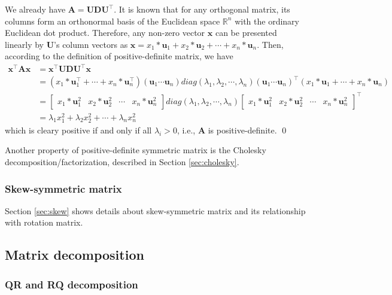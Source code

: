 \documentclass[12pt]{article}
\numberwithin{equation}{section}
\renewenvironment{proof}{{\bfseries Proof.}}{\qed \\}
\begin{document}
\begin{proof}
We already have $\mathbf{A} = \mathbf{U}\mathbf{D}\mathbf{U}^\top$. It is known that for any orthogonal matrix, its columns form an orthonormal basis of the Euclidean space $\mathbb{R}^n$ with the ordinary Euclidean dot product. Therefore, any non-zero vector $\mathbf{x}$ can be presented linearly by $\mathbf{U}$'s column vectors as $\mathbf{x} = x_1*\mathbf{u}_1 + x_2*\mathbf{u}_2 + \cdots + x_n*\mathbf{u}_n$. Then, according to the definition of positive-definite matrix, we have
\begin{align*}
\mathbf{x}^\top \mathbf{A}\mathbf{x} & = \mathbf{x}^\top \mathbf{U}\mathbf{D}\mathbf{U}^\top \mathbf{x} \\
& = (x_1*\mathbf{u}_1^\top + \cdots + x_n*\mathbf{u}_n^\top)
(\mathbf{u}_1 \cdots \mathbf{u}_n)
diag(\lambda_1, \lambda_2, \cdots,\lambda_n)
(\mathbf{u}_1 \cdots \mathbf{u}_n)^\top
(x_1*\mathbf{u}_1 + \cdots + x_n*\mathbf{u}_n) \\
& =
\begin{bmatrix}
x_1*\mathbf{u}_1^2 & x_2*\mathbf{u}_2^2 & \cdots & x_n*\mathbf{u}_n^2
\end{bmatrix}
diag(\lambda_1, \lambda_2, \cdots,\lambda_n)
\begin{bmatrix}
x_1*\mathbf{u}_1^2 & x_2*\mathbf{u}_2^2 & \cdots & x_n*\mathbf{u}_n^2
\end{bmatrix} ^\top \\
&= \lambda_1 x_1^2 + \lambda_2 x_2^2 + \cdots + \lambda_n x_n^2
\end{align*}
which is cleary positive if and only if all $\lambda_i > 0$, i.e., $\mathbf{A}$ is positive-definite.
\end{proof}

Another property of positive-definite symmetric matrix is the Cholesky decomposition/factorization, described in Section \ref{sec:cholesky}.

\subsubsection{Skew-symmetric matrix}

Section \ref{sec:skew} shows details about skew-symmetric matrix and its relationship with rotation matrix.

\subsection{Matrix decomposition}

\subsubsection{QR and RQ decomposition}
\label{sec:rq}
\end{document}
